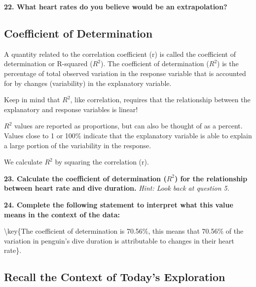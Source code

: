 \documentclass[
  letterpaper,
  DIV=11,
  numbers=noendperiod]{scrartcl}
\begin{document}
\vspace{0.5cm}

\textbf{22. What heart rates do you believe would be an extrapolation?}


\vspace{0.5cm}

\hypertarget{coefficient-of-determination}{%
\subsection{Coefficient of
Determination}\label{coefficient-of-determination}}

A quantity related to the correlation coefficient (r) is called the
coefficient of determination or R-squared (\(R^2\)). The coefficient of
determination (\(R^2\)) is the percentage of total observed variation in
the response variable that is accounted for by changes (variability) in
the explanatory variable.

Keep in mind that \(R^2\), like correlation, requires that the
relationship between the explanatory and response variables is linear!

\(R^2\) values are reported as proportions, but can also be thought of
as a percent. Values close to 1 or 100\% indicate that the explanatory
variable is able to explain a large portion of the variability in the
response.

We calculate \(R^2\) by squaring the correlation (r).

\textbf{23. Calculate the coefficient of determination (\(R^2\)) for the
relationship between heart rate and dive duration.} \emph{Hint: Look
back at question 5.}


\vspace{0.5cm}

\textbf{24. Complete the following statement to interpret what this
value means in the context of the data:}

\textbackslash key\{The coefficient of determination is 70.56\%, this
means that 70.56\% of the variation in penguin's dive duration is
attributable to changes in their heart rate\}.

\hypertarget{recall-the-context-of-todays-exploration}{%
\subsection{Recall the Context of Today's
Exploration}\label{recall-the-context-of-todays-exploration}}
\end{document}
